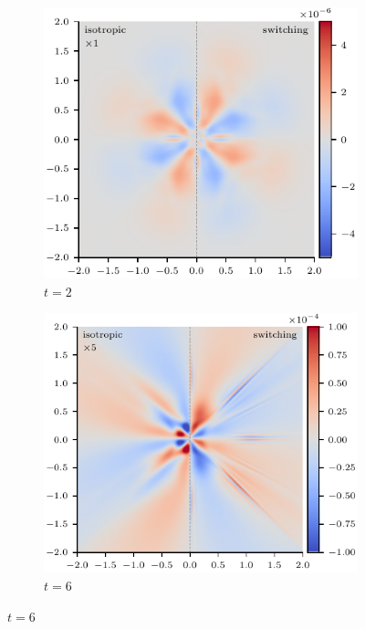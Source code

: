 \begin{figure}[t]
  \centering
    \begin{subfigure}{0.32\textwidth}
      \includegraphics[width=\linewidth]{v-4r-4_uz_t_2}
      \caption{$t=2$}
      \label{fig:v-4r-4_uz_t_2}
    \end{subfigure}
    \begin{subfigure}{0.32\textwidth}
      \includegraphics[width=\linewidth]{v-4r-4_uz_t_6}
      \caption{$t=6$}
      \label{fig:v-4r-4_uz_t_6}
    \end{subfigure}

\end{figure}
